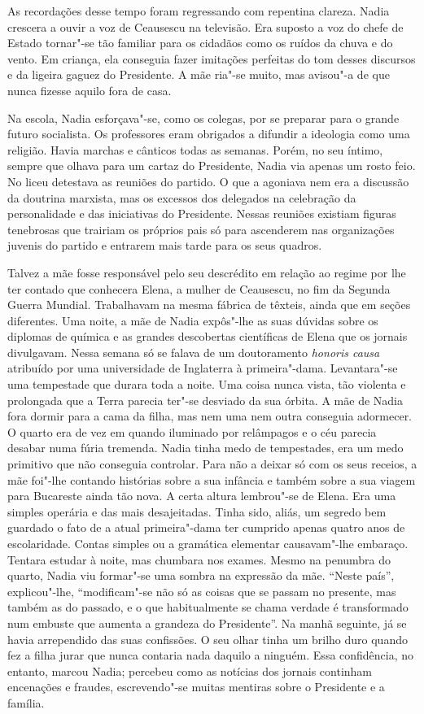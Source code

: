 As recordações desse tempo foram regressando com
repentina clareza. Nadia crescera a ouvir a voz de Ceausescu na
televisão. Era suposto a voz do chefe de Estado tornar"-se tão familiar
para os cidadãos como os ruídos da chuva e do vento. Em criança, ela
conseguia fazer imitações perfeitas do tom desses discursos e da
ligeira gaguez
do Presidente. A mãe ria"-se muito, mas avisou"-a de que nunca fizesse
aquilo fora de casa.

Na escola, Nadia esforçava"-se, como os colegas, por se preparar para o
grande futuro socialista. Os professores eram obrigados a difundir a
ideologia como uma religião. Havia marchas e cânticos todas as semanas.
Porém, no seu íntimo, sempre que olhava para um cartaz do Presidente,
Nadia via apenas um rosto feio. No liceu detestava as reuniões do
partido. O que a agoniava nem era a discussão da doutrina marxista, mas
os excessos dos delegados na celebração da personalidade e das
iniciativas do Presidente. Nessas reuniões existiam figuras tenebrosas
que trairiam os próprios pais só para ascenderem nas organizações
juvenis do partido e entrarem mais tarde para os seus quadros.

Talvez a mãe fosse responsável pelo seu descrédito em relação ao regime
por lhe ter contado que conhecera Elena, a mulher de Ceausescu, no fim
da Segunda Guerra Mundial. Trabalhavam na mesma fábrica de têxteis,
ainda que em seções diferentes. Uma noite, a mãe de Nadia expôs"-lhe as
suas dúvidas sobre os diplomas de química e as grandes descobertas
científicas de Elena que os jornais divulgavam. Nessa semana só se
falava de um doutoramento \emph{honoris causa} atribuído por uma universidade de Inglaterra à
primeira"-dama. Levantara"-se uma tempestade que durara toda a noite. Uma
coisa nunca vista, tão violenta e prolongada que a Terra parecia
ter"-se desviado da sua órbita. A mãe de Nadia fora dormir para a cama da
filha, mas nem uma nem outra conseguia adormecer. O quarto era de vez em
quando iluminado por relâmpagos e o céu parecia desabar numa fúria
tremenda. Nadia tinha medo de tempestades, era um medo primitivo que não conseguia controlar. Para não a
deixar só com os seus receios, a mãe foi"-lhe contando histórias sobre a
sua infância e também sobre a sua viagem para Bucareste ainda tão nova.
A certa altura lembrou"-se de Elena. Era uma simples operária e das mais
desajeitadas. Tinha sido, aliás, um segredo bem guardado o fato de a
atual primeira"-dama ter cumprido apenas quatro anos de escolaridade.
Contas simples ou a gramática elementar causavam"-lhe embaraço. Tentara
estudar à noite, mas chumbara nos exames. Mesmo na penumbra do quarto,
Nadia viu formar"-se uma sombra na expressão da mãe.
``Neste país'', explicou"-lhe, ``modificam"-se não só as coisas que se passam
no presente, mas também as do passado, e o que habitualmente se chama
verdade é transformado num embuste que aumenta a grandeza do
Presidente''. Na manhã seguinte, já se havia arrependido das suas
confissões. O seu olhar tinha um brilho duro quando fez a filha jurar
que nunca contaria nada daquilo a ninguém. Essa confidência, no entanto,
marcou Nadia; percebeu como as notícias dos jornais continham encenações
e fraudes, escrevendo"-se muitas mentiras sobre o Presidente e a
família.

